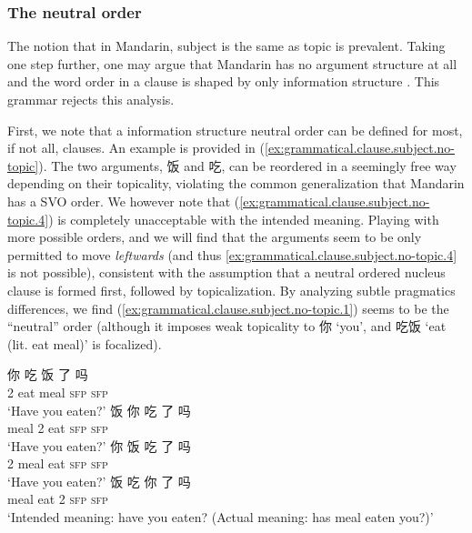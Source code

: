 \documentclass[UTF8, a4paper, oneside, scheme=plain, 12pt]{ctexrep}
\newcommand{\translate}[1]{`#1'}
\newcommand*{\category}[1]{\textsc{#1}}
\begin{document}
\subsubsection{The neutral order}\label{sec:grammatical.clause.subject.topic}

The notion that in Mandarin, subject is the same as topic is prevalent.
Taking one step further, one may argue that Mandarin has no argument structure at all
and the word order in a clause is shaped by only information structure \citep{lapolla20091}.
This grammar rejects this analysis.

First, we note that a information structure neutral order can be defined for most, if not all, clauses.
An example is provided in (\ref{ex:grammatical.clause.subject.no-topic}).
The two arguments, 饭 and 吃, can be reordered in a seemingly free way depending on their topicality,
violating the common generalization that Mandarin has a SVO order.
We however note that (\ref{ex:grammatical.clause.subject.no-topic.4})
is completely unacceptable with the intended meaning.
Playing with more possible orders, and we will find that the arguments seem to be
only permitted to move \emph{leftwards} (and thus \ref{ex:grammatical.clause.subject.no-topic.4} is not possible),
consistent with the assumption that a neutral ordered nucleus clause is formed first,
followed by topicalization.
By analyzing subtle pragmatics differences, we find (\ref{ex:grammatical.clause.subject.no-topic.1}) seems to be the ``neutral'' order 
(although it imposes weak topicality to 你 \translate{you},
and 吃饭 \translate{eat (lit. eat meal)} is focalized).

\begin{exe}
    \ex\label{ex:grammatical.clause.subject.no-topic} 
    \begin{xlist}
        \ex\label{ex:grammatical.clause.subject.no-topic.1}
        \gll 你 吃 饭 了 吗 \\
        2 eat meal \category{sfp} \category{sfp} \\
        \glt\translate{Have you eaten?} 
        \ex\label{ex:grammatical.clause.subject.no-topic.2}
        \gll 饭 你 吃 了 吗 \\
        meal 2 eat \category{sfp} \category{sfp} \\
        \glt\translate{Have you eaten?}
        \ex\label{ex:grammatical.clause.subject.no-topic.3}
        \gll 你 饭 吃 了 吗 \\
        2 meal eat \category{sfp} \category{sfp} \\
        \glt\translate{Have you eaten?}
        \ex\label{ex:grammatical.clause.subject.no-topic.4}
        \gll *饭 吃 你 了 吗  \\
        meal eat 2 \category{sfp} \category{sfp} \\
        \glt\translate{Intended meaning: have you eaten? (Actual meaning: has meal eaten you?)}
    \end{xlist}
\end{exe}
\end{document}
